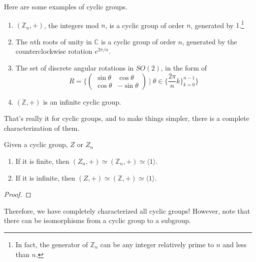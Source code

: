   \begin{example} 
    Here are some examples of cyclic groups. 
    \begin{enumerate}
      \item $(\mathbb{Z}_n, +)$, the integers mod $n$, is a cyclic group of order $n$, generated by $1$.\footnote{In fact, the generator of $\mathbb{Z}_n$ can be any integer relatively prime to $n$ and less than $n$.} 
      \item The $n$th roots of unity in $\mathbb{C}$ is a cyclic group of order $n$, generated by the counterclockwise rotation $e^{2\pi/n}$. 
      \item The set of discrete angular rotations in $SO(2)$, in the form of 
      \begin{equation}
        R =  \bigg\{ \begin{pmatrix}
        \sin{\theta} & \cos{\theta} \\
        \cos{\theta} & -\sin{\theta}
        \end{pmatrix}\; \bigg| \; \theta \in \Big\{\frac{2 \pi}{n} k\Big\}_{k = 0}^{n-1} \bigg\}
      \end{equation}

      \item $(\mathbb{Z}, +)$ is an infinite cyclic group. 
    \end{enumerate}
  \end{example}

  That's really it for cyclic groups, and to make things simpler, there is a complete characterization of them. 

  \begin{theorem}
    Given a cyclic group, $Z$ or $Z_n$ 
    \begin{enumerate}
      \item If it is finite, then $(Z_n, +) \simeq (\mathbb{Z}_n, +) \simeq \langle 1 \rangle$. 
      \item If it is infinite, then $(Z, +) \simeq (\mathbb{Z}, +) \simeq \langle 1 \rangle$. 
    \end{enumerate}
  \end{theorem}
  \begin{proof}
    
  \end{proof}

  Therefore, we have completely characterized all cyclic groups! However, note that there can be isomorphisms from a cyclic group to a subgroup. 


